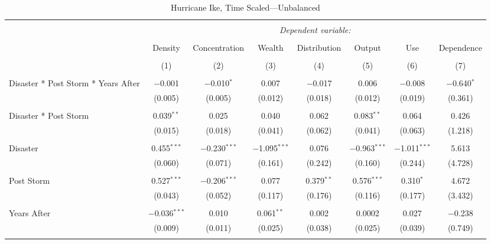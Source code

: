 
\begin{table}[!htbp] \centering 
  \caption{Hurricane Ike, Time Scaled---Unbalanced} 
  \label{} 
\footnotesize 
\begin{tabular}{@{\extracolsep{5pt}}lccccccc} 
\\[-1.8ex]\hline 
\hline \\[-1.8ex] 
 & \multicolumn{7}{c}{\textit{Dependent variable:}} \\ 
\cline{2-8} 
\\[-1.8ex] & Density & Concentration & Wealth & Distribution & Output & Use & Dependence \\ 
\\[-1.8ex] & (1) & (2) & (3) & (4) & (5) & (6) & (7)\\ 
\hline \\[-1.8ex] 
 Disaster * Post Storm * Years After & $-$0.001 & $-$0.010$^{*}$ & 0.007 & $-$0.017 & 0.006 & $-$0.008 & $-$0.640$^{*}$ \\ 
  & (0.005) & (0.005) & (0.012) & (0.018) & (0.012) & (0.019) & (0.361) \\ 
  & & & & & & & \\ 
 Disaster * Post Storm & 0.039$^{**}$ & 0.025 & 0.040 & 0.062 & 0.083$^{**}$ & 0.064 & 0.426 \\ 
  & (0.015) & (0.018) & (0.041) & (0.062) & (0.041) & (0.063) & (1.218) \\ 
  & & & & & & & \\ 
 Disaster & 0.455$^{***}$ & $-$0.230$^{***}$ & $-$1.095$^{***}$ & 0.076 & $-$0.963$^{***}$ & $-$1.011$^{***}$ & 5.613 \\ 
  & (0.060) & (0.071) & (0.161) & (0.242) & (0.160) & (0.244) & (4.728) \\ 
  & & & & & & & \\ 
 Post Storm & 0.527$^{***}$ & $-$0.206$^{***}$ & 0.077 & 0.379$^{**}$ & 0.576$^{***}$ & 0.310$^{*}$ & 4.672 \\ 
  & (0.043) & (0.052) & (0.117) & (0.176) & (0.116) & (0.177) & (3.432) \\ 
  & & & & & & & \\ 
 Years After & $-$0.036$^{***}$ & 0.010 & 0.061$^{**}$ & 0.002 & 0.0002 & 0.027 & $-$0.238 \\ 
  & (0.009) & (0.011) & (0.025) & (0.038) & (0.025) & (0.039) & (0.749) \\ 
  & & & & & & & \\ 

\end{tabular}
\end{table}
